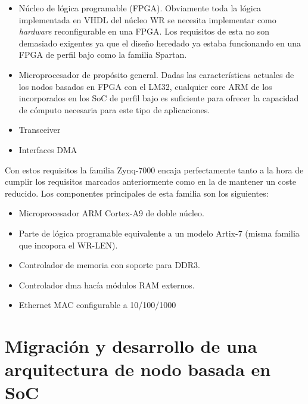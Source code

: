 \begin{itemize}
	\item Núcleo de lógica programable (FPGA). Obviamente toda la lógica 
	implementada en VHDL del núcleo WR se necesita implementar como 
	\textit{hardware} reconfigurable en una FPGA. Los requisitos de esta no son 
	demasiado exigentes ya que el diseño heredado ya estaba funcionando en una 
	FPGA de perfil bajo como la familia Spartan.
	
	\item Microprocesador de propósito general. Dadas las características 
	actuales de los nodos basados en FPGA con el LM32, cualquier core ARM de 
	los incorporados en los SoC de perfil bajo es suficiente para ofrecer la 
	capacidad de cómputo necesaria para este tipo de aplicaciones.
	
	\item Transceiver 
	
	\item Interfaces DMA 
	
\end{itemize}

Con estos requisitos la familia Zynq-7000 encaja perfectamente tanto a la hora 
de cumplir los requisitos marcados anteriormente como en la de mantener un 
coste reducido. Los componentes principales de esta familia son los siguientes:

\begin{itemize}
	\item Microprocesador ARM Cortex-A9 de doble núcleo.
	\item Parte de lógica programable equivalente a un modelo Artix-7 (misma 
	familia que incopora el WR-LEN).
	\item Controlador de memoria con soporte para DDR3.
	\item Controlador \gls{dma} hacía módulos RAM externos.
	\item Ethernet MAC configurable a 10/100/1000 
\end{itemize}





\section{Migración y desarrollo de una arquitectura de nodo basada en SoC}

